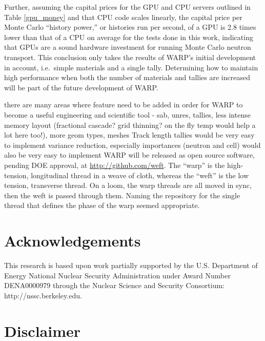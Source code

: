 \documentclass[preprint,12pt]{elsarticle}
\begin{document}
Further, assuming the capital prices for the GPU and CPU servers outlined in Table \ref{gpu_money} and that CPU code scales linearly, the capital price per Monte Carlo ``history power,'' or histories run per second, of a GPU is 2.8 times lower than that of a CPU on average for the tests done in this work, indicating that GPUs are a sound hardware investment for running Monte Carlo neutron transport.%
 This conclusion only takes the results of WARP's initial development in account, i.e.\ simple materials and a single tally.  Determining how to maintain high performance when both the number of materials and tallies are increased will be part of the future development of WARP.

there are many areas where feature need to be added in order for WARP to become a useful engineering and scientific tool - sab, unres, tallies, less intense memory layout (fractional cascade? grid thinning? on the fly temp would help a lot here too!), more geom types, meshes
Track length tallies would be very easy to implement
variance reduction, especially importances (neutron and cell) would also be very easy to implement
WARP will be released as open source software, pending DOE approval, at \url{http://github.com/weft}. The ``warp'' is the high-tension, longitudinal thread in a weave of cloth, whereas the ``weft'' is the low tension, transverse thread.  On a loom, the warp threads are all moved in sync, then the weft is passed through them.  Naming the repository for the single thread that defines the phase of the warp seemed appropriate.

\section*{Acknowledgements}
\label{sec:ack}

This research is based upon work partially supported by the U.S. Department of Energy National Nuclear Security Administration under Award Number DENA0000979 through the Nuclear Science and Security Consortium: http://nssc.berkeley.edu.

\section*{Disclaimer}
\label{sec:disc}
\end{document}
